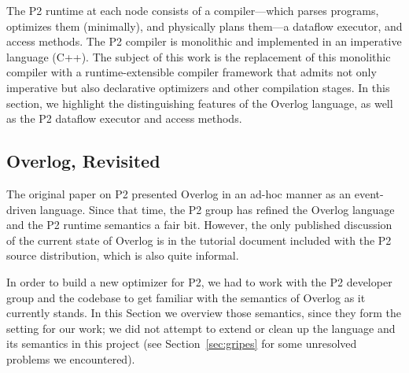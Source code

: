 \documentclass{sigmod08}
\begin{document}
The P2 runtime at each node consists of a compiler---which parses programs,
optimizes them (minimally), and physically plans them---a dataflow executor, and access methods.  The P2 compiler is 
monolithic and implemented in an imperative language (C++). The subject
of this work is the replacement of this monolithic compiler with a
runtime-extensible compiler framework that admits not only imperative
but also declarative optimizers and other compilation stages.  In this section,
we highlight the distinguishing features of the Overlog language, as
well as the P2 dataflow executor and access methods.

\subsection{Overlog, Revisited}
\label{sec:overlog}
The original paper on P2 presented Overlog in an ad-hoc manner as an event-driven language. Since that time, the P2 group has refined the Overlog language and the P2 runtime semantics a fair bit.  However, the only published discussion of the current state of Overlog is in the tutorial document included with the P2 source distribution, which is also quite informal.

In order to build a new optimizer for P2, we had to work with the P2
developer group and the codebase to get familiar with the semantics of
Overlog as it currently stands. In this Section we overview those
semantics, since they form the setting for our work; we did not attempt
to extend or clean up the language and its semantics in this project (see
Section~\ref{sec:gripes} for some unresolved problems we encountered). 
\end{document}
